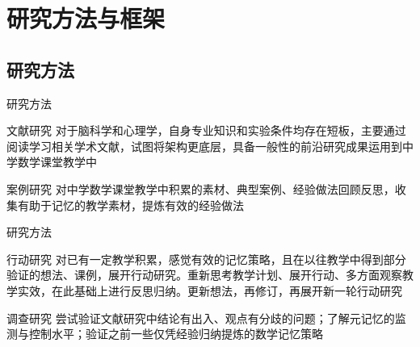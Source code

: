 \documentclass[serif]{beamer}
\begin{document}
  
  \section{研究方法与框架}
  \subsection{研究方法}
  \begin{frame}{研究方法}
     \begin{block}{文献研究}
     	对于脑科学和心理学，自身专业知识和实验条件均存在短板，主要通过阅读学习相关学术文献，试图将架构更底层，具备一般性的前沿研究成果运用到中学数学课堂教学中
     \end{block}
     \pause
     \begin{block}{案例研究}
     	对中学数学课堂教学中积累的素材、典型案例、经验做法回顾反思，收集有助于记忆的教学素材，提炼有效的经验做法
     \end{block}
  \end{frame}
  
  \begin{frame}{研究方法}
      \begin{block}{行动研究}
    	对已有一定教学积累，感觉有效的记忆策略，且在以往教学中得到部分验证的想法、课例，展开行动研究。重新思考教学计划、展开行动、多方面观察教学实效，在此基础上进行反思归纳。更新想法，再修订，再展开新一轮行动研究
    \end{block}
    \pause
    \begin{block}{调查研究}
  	    尝试验证文献研究中结论有出入、观点有分歧的问题；了解元记忆的监测与控制水平；验证之前一些仅凭经验归纳提炼的数学记忆策略
    \end{block}
\end{frame}
  
\end{document}
